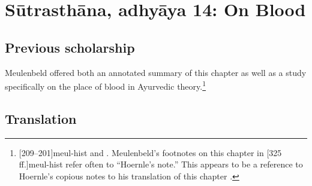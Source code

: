 
\section{Sūtrasthāna, adhyāya 14:  On Blood}


\subsection{Previous scholarship}

Meulenbeld offered both an annotated summary of this chapter as well as a
 study specifically on the place of blood
in Ayurvedic theory.\footnote{[209--201]{meul-hist}  and  \cite{meul-1991}.  Meulenbeld's footnotes
on this chapter in [325\,ff.]{meul-hist} refer often to ``Hoernle's note.''  This appears to be a reference
to Hoernle's copious notes to his translation of this chapter \citep[87--98]{hoer-1897}.}







\subsection{Translation}

